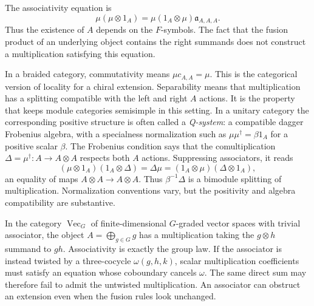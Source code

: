 The associativity equation is
\[
 \mu(\mu\otimes1_A)
 =\mu(1_A\otimes\mu)\mathfrak a_{A,A,A}.
\]
Thus the existence of $A$ depends on the $F$-symbols.  The fact that
the fusion product of an underlying object contains the right
summands does not construct a multiplication satisfying this equation.

In a braided category, commutativity means
$\mu c_{A,A}=\mu$.  This is the categorical version of locality
for a chiral extension.  Separability means that multiplication has
a splitting compatible with the left and right $A$ actions.  It is
the property that keeps module categories semisimple in this setting.
In a unitary category the corresponding positive structure is often
called a \emph{Q-system}: a compatible dagger Frobenius algebra,
with a specialness normalization such as
$\mu\mu^\dagger=\beta 1_A$ for a positive scalar $\beta$.
The Frobenius condition says that the comultiplication
$\Delta=\mu^\dagger:A\to A\otimes A$ respects both $A$ actions.
Suppressing associators, it reads
\[
 (\mu\otimes1_A)(1_A\otimes\Delta)
 =\Delta\mu
 =(1_A\otimes\mu)(\Delta\otimes1_A),
\]
an equality of maps $A\otimes A\to A\otimes A$.
Thus $\beta^{-1}\Delta$ is a bimodule splitting of multiplication.
Normalization conventions vary, but the positivity and algebra
compatibility are substantive.

\begin{example}
In the category $\operatorname{Vec}_G$ of finite-dimensional
$G$-graded vector spaces with trivial associator, the object
$A=\bigoplus_{g\in G}g$ has a multiplication taking the
$g\otimes h$ summand to $gh$.  Associativity is exactly the group
law.  If the associator is instead twisted by a three-cocycle
$\omega(g,h,k)$, scalar multiplication coefficients must satisfy
an equation whose coboundary cancels $\omega$.  The same direct sum
may therefore fail to admit the untwisted multiplication.  An
associator can obstruct an extension even when the fusion rules look
unchanged.
\end{example}


